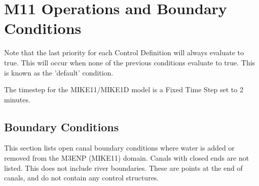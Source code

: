 \section{M11 Operations and Boundary Conditions}

\normalsize
Note that the last priority for each Control Definition will always evaluate to true. This will occur when none of the previous conditions evaluate to true. This is known as the 'default' condition.

The timestep for the MIKE11/MIKE1D model is a Fixed Time Step set to 2 minutes.

\clearpage
\subsection{Boundary Conditions}

This section lists open canal boundary conditions where water is added or removed from the M3ENP (MIKE11) domain. Canals with closed ends are not listed. This does not include river boundaries. These are points at the end of canals, and do not contain any control structures.

